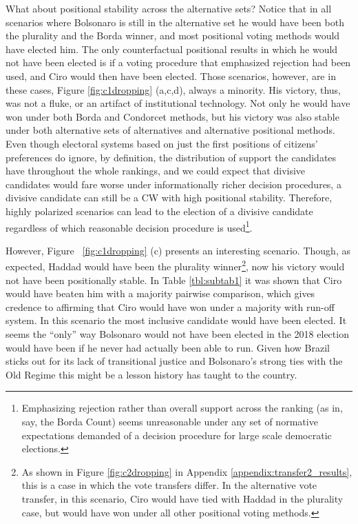 \documentclass[hidelinks,11pt]{article}
\begin{document}
What about positional stability across the alternative sets? Notice that in all scenarios where Bolsonaro is still in the alternative set he would have been both the plurality and the Borda winner, and most positional voting methods would have elected him. The only counterfactual positional results in which he would not have been elected is if a voting procedure that emphasized rejection had been used, and Ciro would then have been elected. Those scenarios, however, are in these cases, Figure \ref{fig:c1dropping} (a,c,d), always a minority. His victory, thus, was not a fluke, or an artifact of institutional technology. Not only he would have won under both Borda and Condorcet methods, but his victory was also stable under both alternative sets of alternatives and alternative positional methods. Even though electoral systems based on just the first positions of citizens' preferences do ignore, by definition, the distribution of support the candidates have throughout the whole rankings, and we could expect that divisive candidates would fare worse under informationally richer decision procedures, a divisive candidate can still be a CW with high positional stability. Therefore, highly polarized scenarios can lead to the election of a divisive candidate regardless of which reasonable decision procedure is used\footnote{Emphasizing rejection rather than overall support across the ranking (as in, say, the Borda Count) seems unreasonable under any set of normative expectations demanded of a decision procedure for large scale democratic elections.}.


However, Figure ~\ref{fig:c1dropping} (c) presents an interesting scenario.
Though, as expected, Haddad would have been the plurality winner\footnote{As
  shown in Figure \ref{fig:c2dropping} in Appendix
  \ref{appendix:transfer2_results}, this is a case in which the vote transfers
  differ. In the alternative vote transfer, in this scenario, Ciro would have
  tied with Haddad in the plurality case, but would have won under all other
  positional voting methods.}, now his victory would not have been positionally
stable. In Table \ref{tbl:subtab1} it was shown that Ciro would have
beaten him with a majority pairwise comparison, which gives credence to affirming
that Ciro would have won under a majority with run-off system. In this scenario
the most inclusive candidate would have been elected. It seems the ``only'' way Bolsonaro would not have been elected in the 2018 election would have been if he never had actually been able to run. Given how Brazil sticks out for its lack of transitional justice and Bolsonaro's strong ties with the Old Regime this might be a lesson history has taught to the country.
\end{document}
